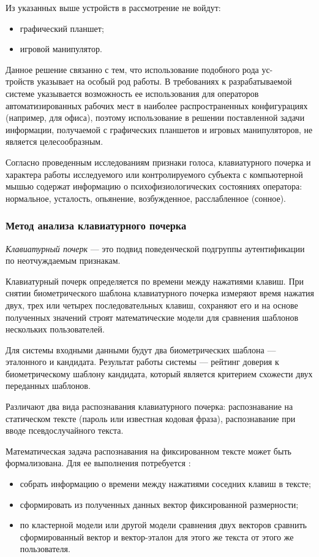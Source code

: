 Из указанных выше устройств в рассмотрение не войдут:
\begin{itemize}[leftmargin=1.6\parindent]
\item графический планшет;
\item игровой манипулятор.
\end{itemize}

Данное решение связанно с тем, что использование подобного рода ус-\\тройств указывает на особый род работы. В требованиях к разрабатываемой системе указывается возможность ее использования для операторов автоматизированных рабочих мест в наиболее распространенных  конфигурациях (например, для офиса), поэтому использование в решении поставленной задачи информации, получаемой с графических планшетов и игровых манипуляторов, не является целесообразным.

Согласно проведенным исследованиям \cite{recognitionOfPsycho} признаки голоса, клавиатурного почерка и характера работы исследуемого или контролируемого субъекта с компьютерной мышью содержат информацию о психофизиологических состояниях оператора: нормальное, усталость, опьянение, возбужденное, расслабленное (сонное).

\subsubsection{Метод анализа клавиатурного почерка}
\textit{Клавиатурный почерк} --- это подвид поведенческой подгруппы аутентификации по неотчуждаемым признакам. \cite{keystroke}

Клавиатурный почерк определяется по времени между нажатиями клавиш. При снятии биометрического шаблона клавиатурного почерка измеряют время нажатия двух, трех или четырех последовательных клавиш, сохраняют его и на основе полученных значений строят математические модели для сравнения шаблонов нескольких пользователей. \cite{intrusionDetection}

 Для системы входными данными будут два биометрических шаблона --- эталонного и кандидата. Результат работы системы --- рейтинг доверия к биометрическому шаблону кандидата, который является критерием схожести двух переданных шаблонов.

Различают два вида распознавания клавиатурного почерка: распознавание на статическом тексте (пароль или известная кодовая фраза), распознавание при вводе псевдослучайного текста. \cite{keystroke}

Математическая задача распознавания на фиксированном тексте может быть формализована. Для ее выполнения потребуется \cite{keystroke}:
\begin{itemize}
\item собрать информацию о времени между нажатиями соседних клавиш в тексте;
\item сформировать из полученных данных вектор фиксированной размерности;
\item по кластерной модели или другой модели сравнения двух векторов сравнить сформированный вектор и вектор-эталон для этого же текста от этого же пользователя.
\end{itemize}

